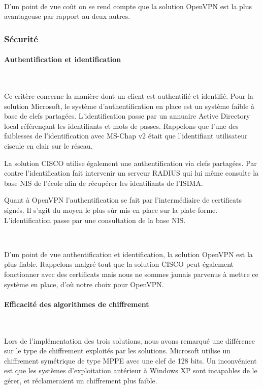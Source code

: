 ~

D'un point de vue coût on se rend compte que la solution OpenVPN est la plus avantageuse par rapport au deux autres.

\subsubsection{Sécurité}

\paragraph{Authentification et identification}
~

Ce critère concerne la manière dont un client est authentifié et identifié. Pour la solution Microsoft, le système d'authentification en place est un système faible à base de clefs partagées. L'identification passe par un annuaire Active Directory local référençant les identifiants et mots de passes. Rappelons que l'une des faiblesses de l'identification avec MS-Chap v2 était que l'identifiant utilisateur ciscule en clair sur le réseau.

La solution CISCO utilise également une authentification via clefs partagées. Par contre l'identification fait intervenir un serveur RADIUS qui lui même consulte la base NIS de l'école afin de récupérer les identifiants de l'ISIMA.

Quant à OpenVPN l'authentification se fait par l'intermédiaire de certificats signés. Il s'agit du moyen le plus sûr mis en place sur la plate-forme. L'identification passe par une consultation de la base NIS.

~

D'un point de vue authentification et identification, la solution OpenVPN est la plus fiable. Rappelons malgré tout que la solution CISCO peut également fonctionner avec des certificats mais nous ne sommes jamais parvenus à mettre ce système en place, d'où notre choix pour OpenVPN.

\paragraph{Efficacité des algorithmes de chiffrement}
~

Lors de l'implémentation des trois solutions, nous avons remarqué une différence sur le type de chiffrement exploités par les solutions. Microsoft utilise un chiffrement symétrique de type MPPE avec une clef de 128 bits. Un inconvénient est que les systèmes d'exploitation antérieur à Windows XP sont incapables de le gérer, et réclameraient un chiffrement plus faible.

